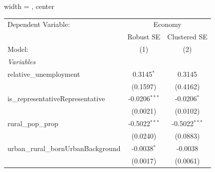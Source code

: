 
\begingroup
\centering
\begin{adjustbox}{width = \textwidth, center}
   \begin{tabular}{lcc}
      \tabularnewline \midrule \midrule
      Dependent Variable: & \multicolumn{2}{c}{Economy}\\
                                                                                                                                                     & Robust SE               & Clustered SE \\   
      Model:                                                                                                                                         & (1)                     & (2)\\  
      \midrule
      \emph{Variables}\\
      relative\_unemployment                                                                                                                         & 0.3145$^{*}$            & 0.3145\\   
                                                                                                                                                     & (0.1597)                & (0.4162)\\   
      is\_representativeRepresentative                                                                                                               & -0.0206$^{***}$         & -0.0206$^{*}$\\   
                                                                                                                                                     & (0.0021)                & (0.0102)\\   
      rural\_pop\_prop                                                                                                                               & -0.5022$^{***}$         & -0.5022$^{***}$\\   
                                                                                                                                                     & (0.0240)                & (0.0883)\\   
      urban\_rural\_bornUrbanBackground                                                                                                              & -0.0038$^{*}$           & -0.0038\\   
                                                                                                                                                     & (0.0017)                & (0.0061)\\   

\end{tabular}
\end{adjustbox}
